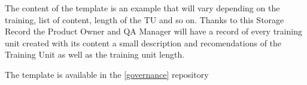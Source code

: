 \documentclass{template/openetcs_article}
\begin{document}
\begin{appendices}
The content of the template is an example that will vary depending on the training, list of content, length of the TU and so on. Thanks to this Storage Record the Product Owner and QA Manager will have a record of every training unit created with its content a small description and recomendations of the Training Unit as well as the training unit length.

The template is available in the \href{https://github.com/openETCS/governance/tree/master/Templates}{[governance]} repository

\end{appendices}
\end{document}
